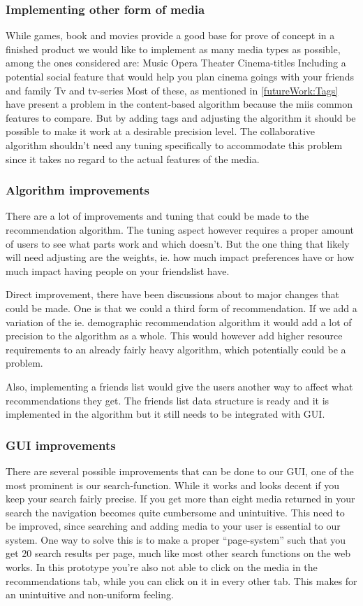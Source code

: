 \subsubsection{Implementing other form of media}
While games, book and movies provide a good base for prove of concept in a finished product we would like to implement as many media types as possible, among the ones considered are:
Music
Opera
Theater
Cinema-titles
Including a potential social feature that would help you plan cinema goings with your friends and family
Tv and tv-series
Most of these, as mentioned in \ref{futureWork:Tags} have present a problem in the content-based algorithm because the miis common features to compare. But by adding tags and adjusting the algorithm it should be possible to make it work at a desirable precision level. The collaborative algorithm shouldn’t need any tuning specifically to accommodate this problem since it takes no regard to the actual features of the media.

\subsubsection{Algorithm improvements}
There are a lot of improvements and tuning that could be made to the recommendation algorithm. The tuning aspect however requires a proper amount of users to see what parts work and which doesn’t. But the one thing that likely will need adjusting are the weights, ie. how much impact preferences have or how much impact having people on your friendslist have.

Direct improvement, there have been discussions about to major changes that could be made. One is that we could a third form of recommendation. If we add a variation of the ie. demographic recommendation algorithm it would add a lot of precision to the algorithm as a whole. This would however add higher resource requirements to an already fairly heavy algorithm, which potentially could be a problem.

Also, implementing a friends list would give the users another way to affect what recommendations they get. The friends list data structure is ready and it is implemented in the algorithm but it still needs to be integrated with GUI.

\subsubsection{GUI improvements}
There are several possible improvements that can be done to our GUI, one of the most prominent is our search-function. While it works and looks decent if you keep your search fairly precise. If you get more than eight media returned in your search the navigation becomes quite cumbersome and unintuitive. This need to be improved, since searching and adding media to your user is essential to our system. One way to solve this is to make a proper “page-system” such that you get 20 search results per page, much like most other search functions on the web works.
In this prototype you’re also not able to click on the media in the recommendations tab, while you can click on it in every other tab. This makes for an unintuitive and non-uniform feeling.

